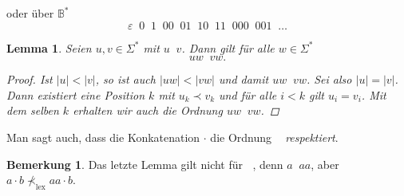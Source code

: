 \documentclass[11pt, a4paper]{article}
\theoremstyle{definition}
\newtheorem*{remark*}{Bemerkung}
\theoremstyle{plain}
\newtheorem{lemma}[definition]{Lemma}
\numberwithin{equation}{section}
\DeclareMathOperator{\lex}{\prec_\text{lex}}
\DeclareMathOperator{\canon}{\prec_\text{cn}}
\begin{document}
oder über $\mathbb{B}^\ast$
$$
	\varepsilon \canon 0 \canon 1 \canon 00 \canon 01 \canon 10 \canon 11 \canon 000 \canon 001 \canon \ldots
$$
\begin{lemma}
	Seien $u, v \in \Sigma^\ast$ mit $u \canon v$. Dann gilt für alle $w \in \Sigma^\ast$
	$$
		uw \canon vw.
	$$
	\begin{proof}
		Ist $|u| < |v|$, so ist auch $|uw| < |vw|$ und damit $uw \canon vw$. Sei also $|u| = |v|$. Dann existiert eine Position $k$ mit $u_k \prec v_k$ und für alle $i < k$ gilt $u_i = v_i$. Mit dem selben $k$ erhalten wir auch die Ordnung $uw \canon vw$.
	\end{proof}
\end{lemma}
Man sagt auch, dass die Konkatenation $\cdot$ die Ordnung $\canon$ \textit{respektiert}.
\begin{remark*}
	Das letzte Lemma gilt nicht für $\lex$, denn $a \lex aa$, aber $a \cdot b \not\prec_\text{lex} aa \cdot b$.
\end{remark*}
\end{document}
